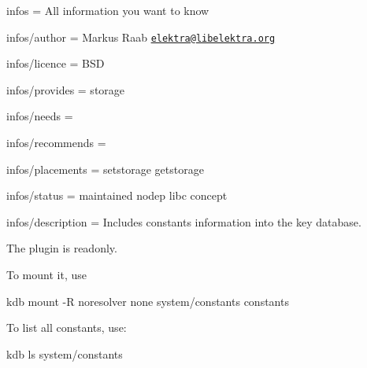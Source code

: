 
\begin{DoxyItemize}
\item infos = All information you want to know
\item infos/author = Markus Raab \href{mailto:elektra@libelektra.org}{\tt elektra@libelektra.\+org}
\item infos/licence = B\+S\+D
\item infos/provides = storage
\item infos/needs =
\item infos/recommends =
\item infos/placements = setstorage getstorage
\item infos/status = maintained nodep libc concept
\item infos/description = Includes constants information into the key database.
\end{DoxyItemize}

The plugin is readonly.

To mount it, use \begin{DoxyVerb}    kdb mount -R noresolver none system/constants constants
\end{DoxyVerb}


To list all constants, use\+: \begin{DoxyVerb}    kdb ls system/constants\end{DoxyVerb}
 